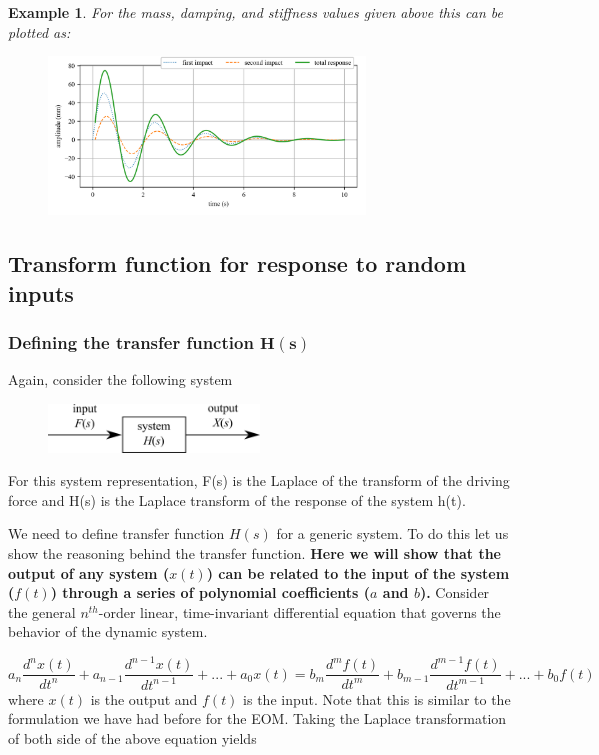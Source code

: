 \documentclass[12pt,letter]{article}
\newtheorem{ex}{Example}
\numberwithin{ex}{section} %
\newenvironment{example}{\begin{mdframed}[middlelinewidth=0.5mm]\begin{ex}\normalfont}{\end{ex}\end{mdframed}}
\begin{document}
\begin{example}
For the mass, damping, and stiffness values given above this can be plotted as:
\begin{figure}[H]
	\centering
	\includegraphics[width=0.75\textwidth]{../Figures/response_double_impact.png}
\end{figure}

\end{example}


\subsection{Transform function for response to random inputs}
	
\subsubsection{Defining the transfer function $\mathbf{H(s)}$}

Again, consider the following system
\begin{figure}[H]
	\centering
	\includegraphics[width=0.5\textwidth]{../Figures/system_input_output.png}
\end{figure}
For this system representation, F(s) is the Laplace of the transform of the driving force and H(s) is the Laplace transform of the response of the system h(t). 

We need to define transfer function $H(s)$ for a generic system. To do this let us show the reasoning behind the transfer function. \textbf{Here we will show that the output of any system ($x(t)$) can be related to the input of the system ($f(t)$) through a series of polynomial coefficients ($a$ and $b$).} Consider the general $n^{th}$-order linear, time-invariant differential equation that governs the behavior of the dynamic system.

\begin{equation}
a_n\frac{d^nx(t)}{dt^n} + a_{n-1}\frac{d^{n-1}x(t)}{dt^{n-1}} + ... + a_0x(t) = b_m\frac{d^mf(t)}{dt^m} + b_{m-1}\frac{d^{m-1}f(t)}{dt^{m-1}} + ... + b_0f(t)
\end{equation} 
where $x(t)$ is the output and $f(t)$ is the input. Note that this is similar to the formulation we have had before for the EOM. Taking the Laplace transformation of both side of the above equation yields
\end{document}

